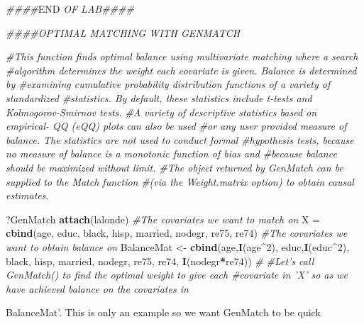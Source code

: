 \documentclass[]{article}
\newenvironment{Shaded}{\begin{snugshade}}{\end{snugshade}}
\newcommand{\CommentTok}[1]{\textcolor[rgb]{0.56,0.35,0.01}{\textit{#1}}}
\newcommand{\DecValTok}[1]{\textcolor[rgb]{0.00,0.00,0.81}{#1}}
\newcommand{\KeywordTok}[1]{\textcolor[rgb]{0.13,0.29,0.53}{\textbf{#1}}}
\newcommand{\NormalTok}[1]{#1}
\newcommand{\OperatorTok}[1]{\textcolor[rgb]{0.81,0.36,0.00}{\textbf{#1}}}
\newcommand{\RegionMarkerTok}[1]{#1}
\newcommand{\StringTok}[1]{\textcolor[rgb]{0.31,0.60,0.02}{#1}}
\begin{document}
\begin{Shaded}
\begin{Highlighting}[]
\CommentTok{####}\RegionMarkerTok{END}\CommentTok{ OF LAB####}









\CommentTok{####OPTIMAL MATCHING WITH GENMATCH}


\CommentTok{#This function finds optimal balance using multivariate matching where a search }
\CommentTok{#algorithm determines the weight each covariate is given. Balance is determined by }
\CommentTok{#examining cumulative probability distribution functions of a variety of standardized }
\CommentTok{#statistics. By default, these statistics include t-tests and Kolmogorov-Smirnov tests.}
\CommentTok{#A variety of descriptive statistics based on empirical- QQ (eQQ) plots can also be used }
\CommentTok{#or any user provided measure of balance. The statistics are not used to conduct formal}
\CommentTok{#hypothesis tests, because no measure of balance is a monotonic function of bias and }
\CommentTok{#because balance should be maximized without limit. }
\CommentTok{#The object returned by GenMatch can be supplied to the Match function }
\CommentTok{#(via the Weight.matrix option) to obtain causal estimates.}

\NormalTok{?GenMatch}
\KeywordTok{attach}\NormalTok{(lalonde)}
\CommentTok{#The covariates we want to match on}
\NormalTok{X =}\StringTok{ }\KeywordTok{cbind}\NormalTok{(age, educ, black, hisp, married, nodegr, re75, re74)}
\CommentTok{#The covariates we want to obtain balance on }
\NormalTok{BalanceMat <-}\StringTok{ }\KeywordTok{cbind}\NormalTok{(age,}\KeywordTok{I}\NormalTok{(age}\OperatorTok{^}\DecValTok{2}\NormalTok{), educ,}\KeywordTok{I}\NormalTok{(educ}\OperatorTok{^}\DecValTok{2}\NormalTok{), black, hisp, married, nodegr, re75, re74, }\KeywordTok{I}\NormalTok{(nodegr}\OperatorTok{*}\NormalTok{re74))}
\CommentTok{#}
\CommentTok{#Let's call GenMatch() to find the optimal weight to give each}
\CommentTok{#covariate in 'X' so as we have achieved balance on the covariates in}
\end{Highlighting}
\end{Shaded}

BalanceMat'. This is only an example so we want GenMatch to be quick
\end{document}
